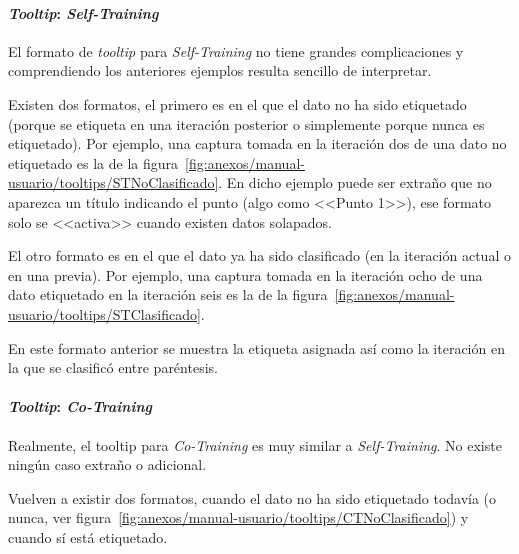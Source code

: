 
\paragraph{\textit{Tooltip}: \textit{Self-Training}}

El formato de \textit{tooltip} para \textit{Self-Training} no tiene grandes
complicaciones y comprendiendo los anteriores ejemplos resulta sencillo de
interpretar.

Existen dos formatos, el primero es en el que el dato no ha sido etiquetado
(porque se etiqueta en una iteración posterior o simplemente porque nunca es
etiquetado). Por ejemplo, una captura tomada en la iteración dos de una dato no
etiquetado es la de la
figura~\ref{fig:anexos/manual-usuario/tooltips/STNoClasificado}. En dicho
ejemplo puede ser extraño que no aparezca un título indicando el punto (algo
como <<Punto 1>>), ese formato solo se <<activa>> cuando existen datos
solapados.


El otro formato es en el que el dato ya ha sido clasificado (en la iteración
actual o en una previa). Por ejemplo, una captura tomada en la iteración ocho de
una dato etiquetado en la iteración seis es la de la
figura~\ref{fig:anexos/manual-usuario/tooltips/STClasificado}.


En este formato anterior se muestra la etiqueta asignada así como la iteración
en la que se clasificó entre paréntesis.

\paragraph{\textit{Tooltip}: \textit{Co-Training}}

Realmente, el tooltip para \textit{Co-Training} es muy similar a
\textit{Self-Training}. No existe ningún caso extraño o adicional.

Vuelven a existir dos formatos, cuando el dato no ha sido etiquetado todavía (o
nunca, ver figura~\ref{fig:anexos/manual-usuario/tooltips/CTNoClasificado}) y
cuando sí está etiquetado. 

